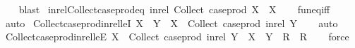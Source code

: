 \begin{isabellebody}
%
\isadelimproof
\ \ %
\endisadelimproof
%
\isatagproof
{}\isamarkupfalse%
\ blast%
\endisatagproof
{\isafoldproof}%
%
\isadelimproof
\isanewline
%
\endisadelimproof
\isanewline
{}\isamarkupfalse%
\ in{\isacharunderscore}{\kern0pt}rel{\isacharunderscore}{\kern0pt}Collect{\isacharunderscore}{\kern0pt}case{\isacharunderscore}{\kern0pt}prod{\isacharunderscore}{\kern0pt}eq{\isacharcolon}{\kern0pt}\ {\isachardoublequoteopen}in{\isacharunderscore}{\kern0pt}rel\ {\isacharparenleft}{\kern0pt}Collect\ {\isacharparenleft}{\kern0pt}case{\isacharunderscore}{\kern0pt}prod\ X{\isacharparenright}{\kern0pt}{\isacharparenright}{\kern0pt}\ {\isacharequal}{\kern0pt}\ X{\isachardoublequoteclose}\isanewline
%
\isadelimproof
\ \ %
\endisadelimproof
%
\isatagproof
{}\isamarkupfalse%
\ fun{\isacharunderscore}{\kern0pt}eq{\isacharunderscore}{\kern0pt}iff\ \isamarkupfalse%
\ auto%
\endisatagproof
{\isafoldproof}%
%
\isadelimproof
\isanewline
%
\endisadelimproof
\isanewline
{}\isamarkupfalse%
\ Collect{\isacharunderscore}{\kern0pt}case{\isacharunderscore}{\kern0pt}prod{\isacharunderscore}{\kern0pt}in{\isacharunderscore}{\kern0pt}rel{\isacharunderscore}{\kern0pt}leI{\isacharcolon}{\kern0pt}\ {\isachardoublequoteopen}X\ {\isasymsubseteq}\ Y\ {\isasymLongrightarrow}\ X\ {\isasymsubseteq}\ Collect\ {\isacharparenleft}{\kern0pt}case{\isacharunderscore}{\kern0pt}prod\ {\isacharparenleft}{\kern0pt}in{\isacharunderscore}{\kern0pt}rel\ Y{\isacharparenright}{\kern0pt}{\isacharparenright}{\kern0pt}{\isachardoublequoteclose}\isanewline
%
\isadelimproof
\ \ %
\endisadelimproof
%
\isatagproof
{}\isamarkupfalse%
\ auto%
\endisatagproof
{\isafoldproof}%
%
\isadelimproof
\isanewline
%
\endisadelimproof
\isanewline
{}\isamarkupfalse%
\ Collect{\isacharunderscore}{\kern0pt}case{\isacharunderscore}{\kern0pt}prod{\isacharunderscore}{\kern0pt}in{\isacharunderscore}{\kern0pt}rel{\isacharunderscore}{\kern0pt}leE{\isacharcolon}{\kern0pt}\ {\isachardoublequoteopen}X\ {\isasymsubseteq}\ Collect\ {\isacharparenleft}{\kern0pt}case{\isacharunderscore}{\kern0pt}prod\ {\isacharparenleft}{\kern0pt}in{\isacharunderscore}{\kern0pt}rel\ Y{\isacharparenright}{\kern0pt}{\isacharparenright}{\kern0pt}\ {\isasymLongrightarrow}\ {\isacharparenleft}{\kern0pt}X\ {\isasymsubseteq}\ Y\ {\isasymLongrightarrow}\ R{\isacharparenright}{\kern0pt}\ {\isasymLongrightarrow}\ R{\isachardoublequoteclose}\isanewline
%
\isadelimproof
\ \ %
\endisadelimproof
%
\isatagproof
{}\isamarkupfalse%
\ force%
\endisatagproof
{\isafoldproof}%

\end{isabellebody}
